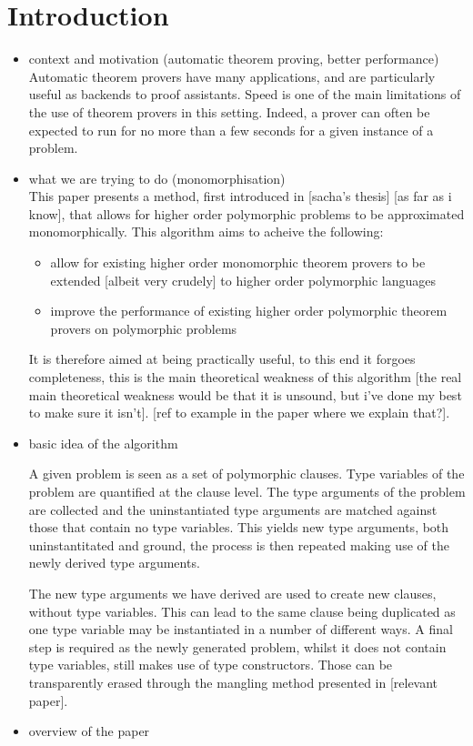 \documentclass{article}
\begin{document}
\section{Introduction}
\begin{itemize}
    \item context and motivation (automatic theorem proving, better performance)\\
       Automatic theorem provers have many applications, and are particularly useful as backends to proof assistants. Speed is one of the main limitations of the use of theorem provers in this setting. Indeed, a prover can often be expected to run for no more than a few seconds for a given instance of a problem.
    \item what we are trying to do (monomorphisation)\\
       This paper presents a method, first introduced in [sacha's thesis] [as far as i know], that allows for higher order polymorphic problems to be approximated monomorphically. This algorithm aims to acheive the following:
         \begin{itemize}
            \item allow for existing higher order monomorphic theorem provers to be extended [albeit very crudely] to higher order polymorphic languages
            \item improve the performance of existing higher order polymorphic theorem provers on polymorphic problems
         \end{itemize}

         It is therefore aimed at being practically useful, to this end it forgoes completeness, this is the main theoretical weakness of this algorithm [the real main theoretical weakness would be that it is unsound, but i've done my best to make sure it isn't]. [ref to example in the paper where we explain that?]. 

    \item basic idea of the algorithm

    A given problem is seen as a set of polymorphic clauses. Type variables of the problem are quantified at the clause level. The type arguments of the problem are collected and the uninstantiated type arguments are matched against those that contain no type variables. This yields new type arguments, both uninstantitated and ground, the process is then repeated making use of the newly derived type arguments.

    The new type arguments we have derived are used to create new clauses, without type variables. This can lead to the same clause being duplicated as one type variable may be instantiated in a number of different ways.
    A final step is required as the newly generated problem, whilst it does not contain type variables, still makes use of type constructors. Those can be transparently erased through the mangling method presented in [relevant paper].
    \item overview of the paper


\end{itemize}
\end{document}
